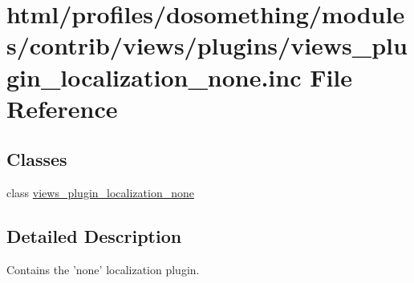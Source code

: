 \hypertarget{views__plugin__localization__none_8inc}{
\section{html/profiles/dosomething/modules/contrib/views/plugins/views\_\-plugin\_\-localization\_\-none.inc File Reference}
\label{views__plugin__localization__none_8inc}
}
\subsection*{Classes}
\begin{DoxyCompactItemize}
\item 
class \hyperlink{classviews__plugin__localization__none}{views\_\-plugin\_\-localization\_\-none}
\end{DoxyCompactItemize}


\subsection{Detailed Description}
Contains the 'none' localization plugin. 